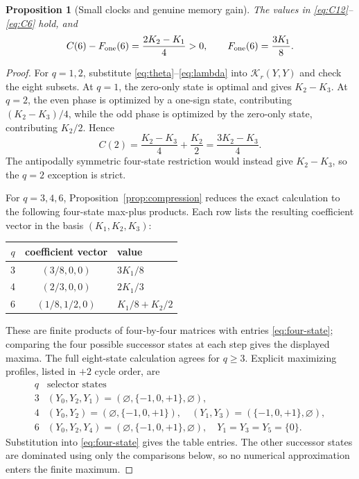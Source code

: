 \documentclass[11pt]{article}
\newtheorem{proposition}[theorem]{Proposition}
\theoremstyle{definition}
\theoremstyle{remark}
\newcommand{\T}{\{-1,0,+1\}}
\begin{document}
\begin{proposition}[Small clocks and genuine memory gain]
\label{prop:small}
The values in \eqref{eq:C12}--\eqref{eq:C6} hold, and
\[
 C(6)-F_{\rm one}(6)=\frac{2K_2-K_1}{4}>0,
 \qquad F_{\rm one}(6)=\frac{3K_1}{8}.
 \label{eq:q6-gap}
\]
\end{proposition}

\begin{proof}
For \(q=1,2\), substitute \eqref{eq:theta}--\eqref{eq:lambda} into
\(\mathcal K_r(Y,Y)\) and check the eight subsets.  At \(q=1\), the
zero-only state is optimal and gives \(K_2-K_3\).  At \(q=2\), the even
phase is optimized by a one-sign state, contributing
\((K_2-K_3)/4\), while the odd phase is optimized by the zero-only state,
contributing \(K_2/2\).  Hence
\[
 C(2)=\frac{K_2-K_3}{4}+\frac{K_2}{2}
 =\frac{3K_2-K_3}{4}.
\]
The antipodally symmetric four-state restriction would instead give
\(K_2-K_3\), so the \(q=2\) exception is strict.

For \(q=3,4,6\), Proposition~\ref{prop:compression} reduces the exact
calculation to the following four-state max-plus products.  Each row lists
the resulting coefficient vector in the basis \((K_1,K_2,K_3)\):
\begin{center}
\begin{tabular}{ccl}
\toprule
\(q\) & coefficient vector & value\\
\midrule
3 & \((3/8,0,0)\) & \(3K_1/8\)\\
4 & \((2/3,0,0)\) & \(2K_1/3\)\\
6 & \((1/8,1/2,0)\) & \(K_1/8+K_2/2\)\\
\bottomrule
\end{tabular}
\end{center}
These are finite products of four-by-four matrices with entries
\eqref{eq:four-state}; comparing the four possible successor states at
each step gives the displayed maxima.  The full eight-state calculation
agrees for \(q\geq3\).  Explicit maximizing profiles, listed in \(+2\)
cycle order, are
\[
\begin{array}{c|c}
q&\text{selector states}\\ \hline
3&(Y_0,Y_2,Y_1)=(\varnothing,\T,\varnothing),\\
4&(Y_0,Y_2)=(\varnothing,\T),\quad
  (Y_1,Y_3)=(\T,\varnothing),\\
6&(Y_0,Y_2,Y_4)=(\varnothing,\T,\varnothing),\quad
  Y_1=Y_3=Y_5=\{0\}.
\end{array}
\]
Substitution into \eqref{eq:four-state} gives the table entries.  The
other successor states are dominated using only the comparisons below,
so no numerical approximation enters the finite maximum.


\end{proof}
\end{document}
